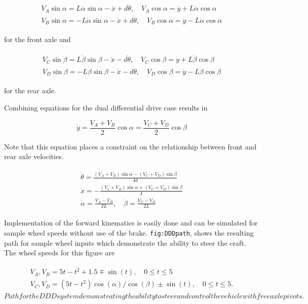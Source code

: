 \[\begin{aligned}
\begin{array}{l} V_A\sin\alpha = L\dot{\alpha}\sin\alpha-\dot{x}+d\dot{\theta}, \quad
V_A\cos\alpha = \dot{y}+L\dot{\alpha}\cos\alpha \\[4mm]
V_B\sin\alpha = -L\dot{\alpha}\sin\alpha-\dot{x}+d\dot{\theta}, \quad
V_B\cos\alpha = \dot{y}-L\dot{\alpha}\cos\alpha \end{array}
\end{aligned}\]

for the front axle and

\[\begin{aligned}
\begin{array}{l}  V_C\sin\beta = L\dot{\beta}\sin\beta-\dot{x}-d\dot{\theta}, \quad
V_C\cos\beta = \dot{y}+L\dot{\beta}\cos\beta \\[4mm]
V_D\sin\beta = -L\dot{\beta}\sin\beta-\dot{x}-d\dot{\theta}, \quad
V_D\cos\beta = \dot{y}-L\dot{\beta}\cos\beta\end{array}
\end{aligned}\]

for the rear axle.

Combining equations for the dual differential drive case results in

\[\dot{y} = \frac{V_A+V_B}{2}\cos\alpha=\frac{V_C+V_D}{2}\cos\beta\]

Note that this equation places a constraint on the relationship between
front and rear axle velocities.

\[\begin{aligned}
\begin{array}{l}
\displaystyle \dot{\theta} = \frac{(V_A+V_B)\sin\alpha-(V_C+V_D)\sin\beta}{4d}\\[4mm]
\displaystyle \dot{x} = -\frac{(V_a+V_B)\sin\alpha+(V_C+V_D)\sin\beta}{4}\\[4mm]
\displaystyle \dot{\alpha} = \frac{V_A-V_B}{2L}, \quad
\dot{\beta} = \frac{V_C-V_D}{2L}\end{array}
\end{aligned}\]

Implementation of the forward kinematics is easily done and can be
simulated for sample wheel speeds without use of the brake.
\texttt{fig:DDDpath}, shows the resulting path for sample wheel inputs
which demonstrate the ability to steer the craft. The wheel speeds for
this figure are

\[\begin{aligned}
\begin{array}{l}
V_A, V_B =  5t - t^2 + 1.5 \mp \sin(t), \quad 0 \leq t \leq 5 \\[3mm]
V_C, V_D = (5t - t^2)\cos(\alpha)/\cos(\beta) \pm \sin(t) ,   \quad 0 \leq t \leq 5 .
\end{array}
\end{aligned}\]\[Path for the DDD system demonstrating the ability to steer and
control the vehicle with free axle pivots.\]

